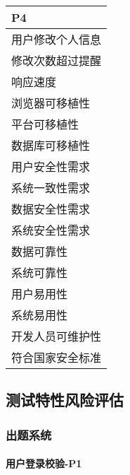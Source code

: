 \documentclass[hyperref, a4paper]{ctexart}
\let\oldparagraph\paragraph
\renewcommand{\paragraph}[1]{\oldparagraph{#1}\mbox{}}
\begin{document}
\begin{tabular}{|p{10cm}|}
\hline
P4\\
\hline
用户修改个人信息\\
\hline
修改次数超过提醒\\
\hline
响应速度\\
\hline
浏览器可移植性\\
\hline
平台可移植性\\
\hline
数据库可移植性\\
\hline
用户安全性需求\\
\hline
系统一致性需求\\
\hline
数据安全性需求\\
\hline
系统安全性需求\\
\hline
数据可靠性\\
\hline
系统可靠性\\
\hline
用户易用性\\
\hline
系统易用性\\
\hline
开发人员可维护性\\
\hline
符合国家安全标准\\
\hline
\end{tabular}

\hypertarget{ux6d4bux8bd5ux7279ux6027ux98ceux9669ux8bc4ux4f30}{%
\subsection{测试特性风险评估}\label{ux6d4bux8bd5ux7279ux6027ux98ceux9669ux8bc4ux4f30}}

\hypertarget{ux51faux9898ux7cfbux7edf-1}{%
\subsubsection{出题系统}\label{ux51faux9898ux7cfbux7edf-1}}

\hypertarget{ux7528ux6237ux767bux5f55ux6821ux9a8c-p1}{%
\paragraph{用户登录校验-P1}\label{ux7528ux6237ux767bux5f55ux6821ux9a8c-p1}}
\end{document}
